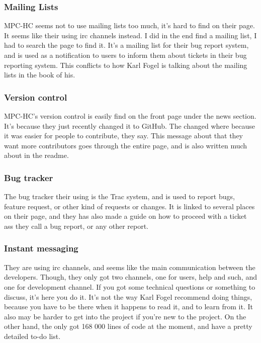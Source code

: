 \documentclass{report} %
\begin{document}
\subsubsection{Mailing Lists}
MPC-HC seems not to use mailing lists too much, it's hard to find on their page. It seems like their using irc channels instead. I did in the end find a mailing list, I had to search the page to find it. It's a mailing list for their bug report system, and is used as a notification to users to inform them about tickets in their bug reporting system\cite{mpctracsupport}\cite{mpctracmail}. This conflicts to how Karl Fogel is talking about the mailing lists in the book\cite{kfposs} of his. %
\subsubsection{Version control}
MPC-HC's version control is easily find on the front page\cite{mpcsweb} under the news section. It's because they just recently changed it to GitHub. The changed where because it was easier for people to contribute, they say. This message about that they want more contributors goes through the entire page, and is also written much about in the readme\cite{mpcsource}.
\subsubsection{Bug tracker}
The bug tracker their using is the Trac\cite{tracweb} system, and is used to report bugs, feature request, or other kind of requests or changes. It is linked to several places on their page, and they has also made a guide%
on how to proceed with a ticket ass they call a bug report, or any other report. 
\subsubsection{Instant messaging}
They are using irc channels\cite{mpccontact}, and seems like the main communication between the developers. Though, they only got two channels, one for users, help and such, and one for development channel. If you got some technical questions or something to discuss, it's here you do it. It's not the way Karl Fogel recommend doing things, because you have to be there when it happens to read it, and to learn from it. It also may be harder to get into the project if you're new to the project. On the other hand, the only got 168 000 lines of code\cite{ohlohmpc} at the moment, and have a pretty detailed to-do list\cite{mpctodo}.
\end{document}
